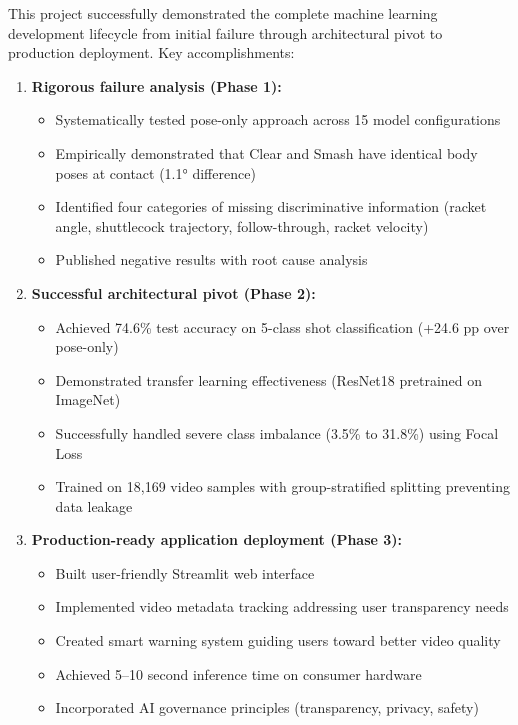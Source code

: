 \documentclass[11pt,a4paper]{article}
\begin{document}
This project successfully demonstrated the complete machine learning development lifecycle from initial failure through architectural pivot to production deployment. Key accomplishments:

\begin{enumerate}
\item \textbf{Rigorous failure analysis (Phase 1):}
   \begin{itemize}
   \item Systematically tested pose-only approach across 15 model configurations
   \item Empirically demonstrated that Clear and Smash have identical body poses at contact (1.1° difference)
   \item Identified four categories of missing discriminative information (racket angle, shuttlecock trajectory, follow-through, racket velocity)
   \item Published negative results with root cause analysis
   \end{itemize}

\item \textbf{Successful architectural pivot (Phase 2):}
   \begin{itemize}
   \item Achieved 74.6\% test accuracy on 5-class shot classification (+24.6 pp over pose-only)
   \item Demonstrated transfer learning effectiveness (ResNet18 pretrained on ImageNet)
   \item Successfully handled severe class imbalance (3.5\% to 31.8\%) using Focal Loss
   \item Trained on 18,169 video samples with group-stratified splitting preventing data leakage
   \end{itemize}

\item \textbf{Production-ready application deployment (Phase 3):}
   \begin{itemize}
   \item Built user-friendly Streamlit web interface
   \item Implemented video metadata tracking addressing user transparency needs
   \item Created smart warning system guiding users toward better video quality
   \item Achieved 5--10 second inference time on consumer hardware
   \item Incorporated AI governance principles (transparency, privacy, safety)
   \end{itemize}


\end{enumerate}
\end{document}
